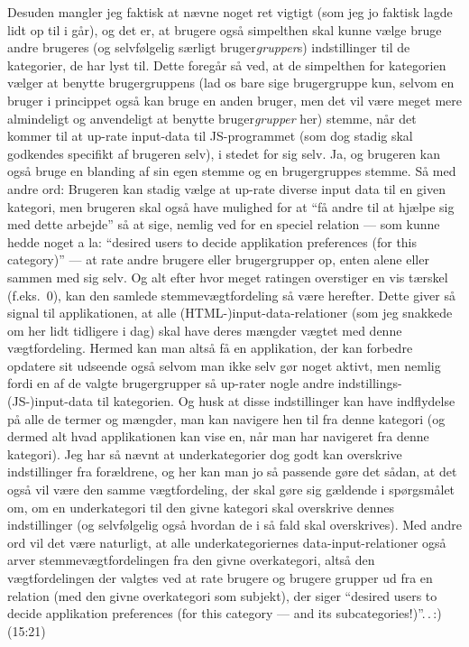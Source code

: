 \documentclass{report}
\begin{document}
Desuden mangler jeg faktisk at nævne noget ret vigtigt (som jeg jo faktisk lagde lidt op til i går), og det er, at brugere også simpelthen skal kunne vælge bruge andre brugeres (og selvfølgelig særligt bruger\emph{grupper}s) indstillinger til de kategorier, de har lyst til. Dette foregår så ved, at de simpelthen for kategorien vælger at benytte brugergruppens (lad os bare sige brugergruppe kun, selvom en bruger i princippet også kan bruge en anden bruger, men det vil være meget mere almindeligt og anvendeligt at benytte bruger\emph{grupper} her) stemme, når det kommer til at up-rate input-data til JS-programmet (som dog stadig skal godkendes specifikt af brugeren selv), i stedet for sig selv. Ja, og brugeren kan også bruge en blanding af sin egen stemme og en brugergruppes stemme. Så med andre ord: Brugeren kan stadig vælge at up-rate diverse input data til en given kategori, men brugeren skal også have mulighed for at ``få andre til at hjælpe sig med dette arbejde'' så at sige, nemlig ved for en speciel relation --- som kunne hedde noget a la: ``desired users to decide applikation preferences (for this category)'' --- at rate andre brugere eller brugergrupper op, enten alene eller sammen med sig selv. Og alt efter hvor meget ratingen overstiger en vis tærskel (f.eks.\ 0), kan den samlede stemmevægtfordeling så være herefter. Dette giver så signal til applikationen, at alle (HTML-)input-data-relationer (som jeg snakkede om her lidt tidligere i dag) skal have deres mængder vægtet med denne vægtfordeling. Hermed kan man altså få en applikation, der kan forbedre opdatere sit udseende også selvom man ikke selv gør noget aktivt, men nemlig fordi en af de valgte brugergrupper så up-rater nogle andre indstillings-(JS-)input-data til kategorien. Og husk at disse indstillinger kan have indflydelse på alle de termer og mængder, man kan navigere hen til fra denne kategori (og dermed alt hvad applikationen kan vise en, når man har navigeret fra denne kategori). Jeg har så nævnt at underkategorier dog godt kan overskrive indstillinger fra forældrene, og her kan man jo så passende gøre det sådan, at det også vil være den samme vægtfordeling, der skal gøre sig gældende i spørgsmålet om, om en underkategori til den givne kategori skal overskrive dennes indstillinger (og selvfølgelig også hvordan de i så fald skal overskrives). Med andre ord vil det være naturligt, at alle underkategoriernes data-input-relationer også arver stemmevægtfordelingen fra den givne overkategori, altså den vægtfordelingen der valgtes ved at rate brugere og brugere grupper ud fra en relation (med den givne overkategori som subjekt), der siger ``desired users to decide applikation preferences (for this category --- and its subcategories!)''.\,.\,:) (15:21)
\end{document}
